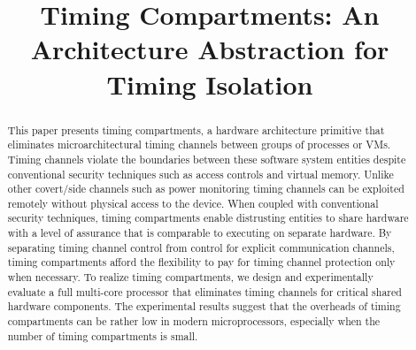 \title{
\vspace{-0.1in}
    Timing Compartments: An Architecture Abstraction for Timing Isolation
}



\date{}
\maketitle

\thispagestyle{empty}

\begin{abstract}
    This paper presents timing compartments, a hardware architecture primitive 
    that eliminates microarchitectural timing channels between groups of 
    processes or VMs. Timing channels violate the boundaries between these 
    software system entities despite conventional security techniques such as 
    access controls and virtual memory. Unlike other covert/side channels such 
    as power monitoring timing channels can be exploited remotely without 
    physical access to the device. When coupled with conventional security 
    techniques, timing compartments enable distrusting entities to share 
    hardware with a level of assurance that is comparable to executing
    on separate hardware. By separating timing channel control from control for 
    explicit communication channels, timing compartments afford the flexibility 
    to pay for timing channel protection only when necessary. To realize timing 
    compartments, we design and experimentally evaluate a full multi-core 
    processor that eliminates timing channels for critical shared hardware 
    components. The experimental results suggest that the overheads of
    timing compartments can be rather low in modern microprocessors, especially 
    when the number of timing compartments is small.

\end{abstract}
